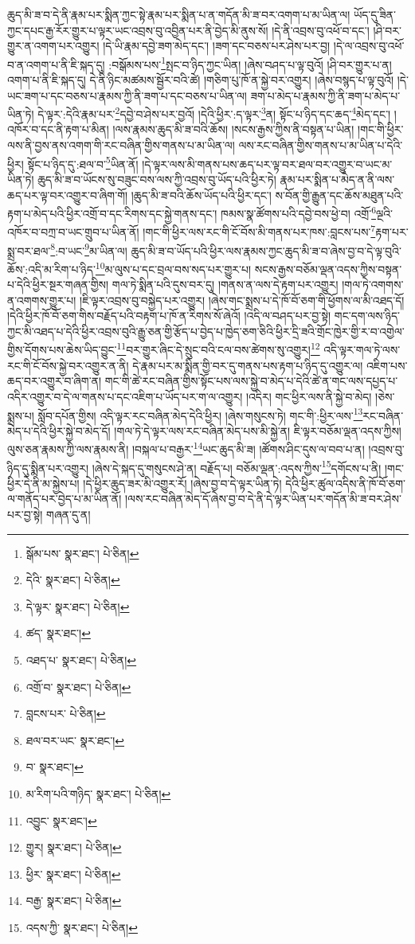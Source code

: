 ཆུད་མི་ཟ་བ་དེ་ནི་རྣམ་པར་སྨིན་ཀྱང་སྟེ་རྣམ་པར་སྨིན་པ་ན་གདོན་མི་ཟ་བར་འགག་པ་མ་ཡིན་ལ། ཡོད་དུ་ཟིན་ཀྱང་དཔང་རྒྱ་རོར་གྱུར་པ་ལྟར་ཡང་འབྲས་བུ་འབྱིན་པར་ནི་བྱེད་མི་ནུས་སོ། །དེ་ནི་འབྲས་བུ་འཕོ་བ་དང་། །ཤི་བར་གྱུར་ན་འགག་པར་འགྱུར། །དེ་ཡི་རྣམ་དབྱེ་ཟག་མེད་དང་། །ཟག་དང་བཅས་པར་ཤེས་པར་བྱ། །དེ་ལ་འབྲས་བུ་འཕོ་བ་ན་འགག་པ་ནི་ཇི་སྐད་དུ། :བསྒོམས་པས་\footnote{སྒོམ་པས་  སྣར་ཐང་།  པེ་ཅིན། }སྤང་བ་ཉིད་ཀྱང་ཡིན། །ཞེས་བཤད་པ་ལྟ་བུའོ། །ཤི་བར་གྱུར་པ་ན། འགག་པ་ནི་ཇི་སྐད་དུ། དེ་ནི་ཉིང་མཚམས་སྦྱོར་བའི་ཚེ། །གཅིག་པུ་ཁོ་ན་སྐྱེ་བར་འགྱུར། །ཞེས་བསྙད་པ་ལྟ་བུའོ། །དེ་ཡང་ཟག་པ་དང་བཅས་པ་རྣམས་ཀྱི་ནི་ཟག་པ་དང་བཅས་པ་ཡིན་ལ། ཟག་པ་མེད་པ་རྣམས་ཀྱི་ནི་ཟག་པ་མེད་པ་ཡིན་ཏེ། དེ་ལྟར་:དེའི་རྣམ་པར་\footnote{དེའི་  སྣར་ཐང་།  པེ་ཅིན། }དབྱེ་བ་ཤེས་པར་བྱའོ། །དེའི་ཕྱིར་:ད་ལྟར་\footnote{དེ་ལྟར་  སྣར་ཐང་།  པེ་ཅིན། }ན། སྟོང་པ་ཉིད་དང་ཆད་\footnote{ཚད་  སྣར་ཐང་། }མེད་དང་། །འཁོར་བ་དང་ནི་རྟག་པ་མིན། །ལས་རྣམས་ཆུད་མི་ཟ་བའི་ཆོས། །སངས་རྒྱས་ཀྱིས་ནི་བསྟན་པ་ཡིན། །གང་གི་ཕྱིར་ལས་ནི་བྱས་ནས་འགག་གི་རང་བཞིན་གྱིས་གནས་པ་མ་ཡིན་ལ། ལས་རང་བཞིན་གྱིས་གནས་པ་མ་ཡིན་པ་དེའི་ཕྱིར། སྟོང་པ་ཉིད་དུ་:ཐལ་བ་\footnote{འཐད་པ་  སྣར་ཐང་།  པེ་ཅིན། }ཡིན་ནོ། །དེ་ལྟར་ལས་མི་གནས་པས་ཆད་པར་ལྟ་བར་ཐལ་བར་འགྱུར་བ་ཡང་མ་ཡིན་ཏེ། ཆུད་མི་ཟ་བ་ཡོངས་སུ་བཟུང་བས་ལས་ཀྱི་འབྲས་བུ་ཡོད་པའི་ཕྱིར་ཏེ། རྣམ་པར་སྨིན་པ་མེད་ན་ནི་ལས་ཆད་པར་ལྟ་བར་འགྱུར་བ་ཞིག་གོ། །ཆུད་མི་ཟ་བའི་ཆོས་ཡོད་པའི་ཕྱིར་དང་། ས་བོན་གྱི་རྒྱུན་དང་ཆོས་མཐུན་པའི་རྟག་པ་མེད་པའི་ཕྱིར་འགྲོ་བ་དང་རིགས་དང་སྐྱེ་གནས་དང་། ཁམས་སྣ་ཚོགས་པའི་དབྱེ་བས་ཕྱེ་བ། འགྲོ་\footnote{འགྲོ་བ་  སྣར་ཐང་།  པེ་ཅིན། }ལྔའི་འཁོར་བ་བཀྲ་བ་ཡང་གྲུབ་པ་ཡིན་ནོ། །གང་གི་ཕྱིར་ལས་རང་གི་ངོ་བོས་མི་གནས་པར་ཁས་:བླངས་པས་\footnote{བླངས་པར་  པེ་ཅིན། }རྟག་པར་སྨྲ་བར་ཐལ་\footnote{ཐལ་བར་ཡང་  སྣར་ཐང་། }:བ་ཡང་\footnote{བ་  སྣར་ཐང་། }མ་ཡིན་ལ། ཆུད་མི་ཟ་བ་ཡོད་པའི་ཕྱིར་ལས་རྣམས་ཀྱང་ཆུད་མི་ཟ་བ་ཞེས་བྱ་བ་དེ་ལྟ་བུའི་ཆོས་:འདི་མ་རིག་པ་ཉིད་\footnote{མ་རིག་པའི་གཉིད་  སྣར་ཐང་།  པེ་ཅིན། }མ་ལུས་པ་དང་བྲལ་བས་སད་པར་གྱུར་པ། སངས་རྒྱས་བཅོམ་ལྡན་འདས་ཀྱིས་བསྟན་པ་དེའི་ཕྱིར་སྔར་གཞན་གྱིས། གལ་ཏེ་སྨིན་པའི་དུས་བར་དུ། །གནས་ན་ལས་དེ་རྟག་པར་འགྱུར། །གལ་ཏེ་འགགས་ན་འགགས་གྱུར་པ། །ཇི་ལྟར་འབྲས་བུ་བསྐྱེད་པར་འགྱུར། །ཞེས་གང་སྨྲས་པ་དེ་ཁོ་བོ་ཅག་གི་ཕྱོགས་ལ་མི་འཐད་དོ། །དེའི་ཕྱིར་ཁོ་བོ་ཅག་གིས་བརྗོད་པའི་བརྟག་པ་ཁོ་ན་རིགས་སོ་ཞེའོ། །འདི་ལ་བཤད་པར་བྱ་སྟེ། གང་དག་ལས་ཉིད་ཀྱང་མི་འཐད་པ་དེའི་ཕྱིར་འབྲས་བུའི་རྒྱུ་ཅན་གྱི་རྩོད་པ་བྱེད་པ་ཁྱེད་ཅག་ཅིའི་ཕྱིར་དྲི་ཟའི་གྲོང་ཁྱེར་གྱི་ར་བ་འགྱེལ་གྱིས་དོགས་པས་ཆེས་ཡིད་བྱུང་\footnote{འབྱུང་  སྣར་ཐང་། }བར་གྱུར་ཞིང་དེ་སྲུང་བའི་ངལ་བས་ཚེགས་སུ་འགྱུར།\footnote{གྱུར།  སྣར་ཐང་།  པེ་ཅིན། } འདི་ལྟར་གལ་ཏེ་ལས་རང་གི་ངོ་བོས་སྐྱེ་བར་འགྱུར་ན་ནི། དེ་རྣམ་པར་མ་སྨིན་གྱི་བར་དུ་གནས་པས་རྟག་པ་ཉིད་དུ་འགྱུར་ལ། འཇིག་པས་ཆད་བར་འགྱུར་བ་ཞིག་ན། གང་གི་ཚེ་རང་བཞིན་གྱིས་སྟོང་པས་ལས་སྐྱེ་བ་མེད་པ་དེའི་ཚེ་ན་གང་ལས་དཔྱད་པ་འདིར་འགྱུར་བ་དེ་ལ་གནས་པ་དང་འཇིག་པ་ཡོད་པར་ག་ལ་འགྱུར། །འདིར། གང་ཕྱིར་ལས་ནི་སྐྱེ་བ་མེད། །ཅེས་སྨྲས་པ། སློབ་དཔོན་གྱིས། འདི་ལྟར་རང་བཞིན་མེད་དེའི་ཕྱིར། །ཞེས་གསུངས་ཏེ། གང་གི་:ཕྱིར་ལས་\footnote{ཕྱིར་  སྣར་ཐང་།  པེ་ཅིན། }རང་བཞིན་མེད་པ་དེའི་ཕྱིར་སྐྱེ་བ་མེད་དོ། །གལ་ཏེ་དེ་ལྟར་ལས་རང་བཞིན་མེད་པས་མི་སྐྱེ་ན། ཇི་ལྟར་བཅོམ་ལྡན་འདས་ཀྱིས། ལུས་ཅན་རྣམས་ཀྱི་ལས་རྣམས་ནི། །བསྐལ་པ་བརྒྱར་\footnote{བརྒྱ་  སྣར་ཐང་།  པེ་ཅིན། }ཡང་ཆུད་མི་ཟ། །ཚོགས་ཤིང་དུས་ལ་བབ་པ་ན། །འབྲས་བུ་ཉིད་དུ་སྨིན་པར་འགྱུར། །ཞེས་དེ་སྐད་དུ་གསུངས་ཤེ་ན། བརྗོད་པ། བཅོམ་ལྡན་:འདས་ཀྱིས་\footnote{འདས་ཀྱི་  སྣར་ཐང་།  པེ་ཅིན། }དགོངས་པ་ནི། །གང་ཕྱིར་དེ་ནི་མ་སྐྱེས་པ། །དེ་ཕྱིར་ཆུད་ཟར་མི་འགྱུར་རོ། །ཞེས་བྱ་བ་དེ་ལྟར་ཡིན་ཏེ། དེའི་ཕྱིར་ཚུལ་འདིས་ནི་ཁོ་བོ་ཅག་ལ་གནོད་པར་བྱེད་པ་མ་ཡིན་ནོ། །ལས་རང་བཞིན་མེད་དོ་ཞེས་བྱ་བ་དེ་ནི་དེ་ལྟར་ཡིན་པར་གདོན་མི་ཟ་བར་ཤེས་པར་བྱ་སྟེ། གཞན་དུ་ན། 